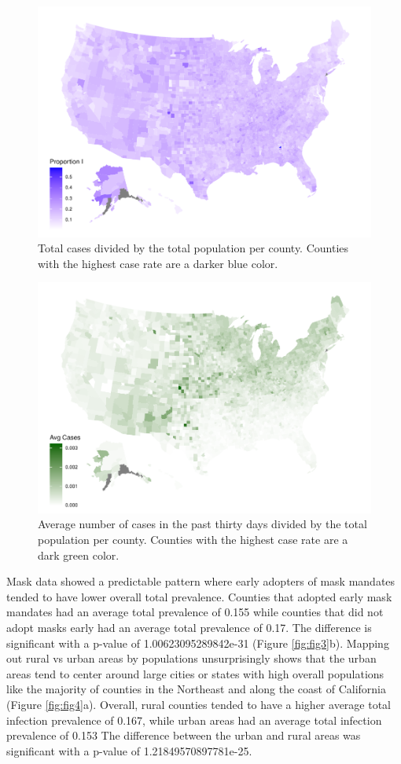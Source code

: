 \documentclass[
  12pt,
]{article}
\begin{document}
\begin{figure}[H]

{\centering \includegraphics[width=0.7\linewidth,]{Final-Manuscript_files/figure-latex/fig1-1} 

}

\caption{Total cases divided by the total population per county. Counties with the highest case rate are a darker blue color.}\label{fig:fig1}
\end{figure}



\begin{figure}[H]

{\centering \includegraphics[width=0.7\linewidth,]{Final-Manuscript_files/figure-latex/fig2-1} 

}

\caption{Average number of cases in the past thirty days divided by the total population per county. Counties with the highest case rate are a dark green color.}\label{fig:fig2}
\end{figure}

Mask data showed a predictable pattern where early adopters of mask mandates tended to have lower overall total prevalence. Counties that adopted early mask mandates had an average total prevalence of 0.155 while counties that did not adopt masks early had an average total prevalence of 0.17. The difference is significant with a p-value of 1.00623095289842e-31 (Figure \ref{fig:fig3}b). Mapping out rural vs urban areas by populations unsurprisingly shows that the urban areas tend to center around large cities or states with high overall populations like the majority of counties in the Northeast and along the coast of California (Figure \ref{fig:fig4}a). Overall, rural counties tended to have a higher average total infection prevalence of 0.167, while urban areas had an average total infection prevalence of 0.153 The difference between the urban and rural areas was significant with a p-value of 1.21849570897781e-25.
\end{document}
